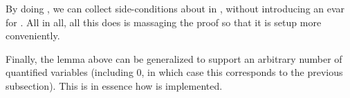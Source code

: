 \documentclass[xetex,format=acmlarge,screen=true,authorversion=true]{acmart-modified}
\begin{document}
By doing , we can collect side-conditions about 
in , without introducing an evar for . All in all, all this does
is massaging the proof so that it is setup more conveniently.

Finally, the lemma above can be generalized to support an arbitrary number of
quantified variables (including 0, in which case this corresponds to the
previous subsection). This is in essence how  is
implemented.






\end{document}
